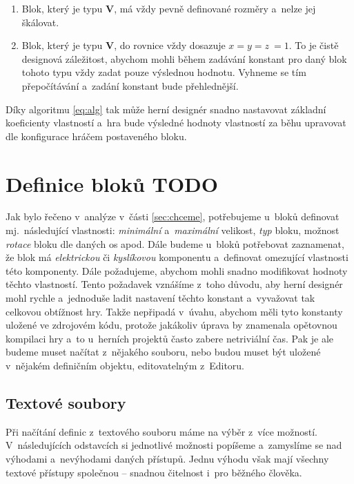 \begin{enumerate}
	\item Blok, který je typu \textbf{V}, má vždy pevně definované rozměry a~nelze jej škálovat.
	\item Blok, který je typu \textbf{V}, do rovnice vždy dosazuje $ x = y = z~= 1$.
	\subitem To je čistě designová záležitost, abychom mohli během zadávání konstant pro daný blok tohoto typu vždy zadat pouze výslednou hodnotu. Vyhneme se tím přepočítávání a~zadání konstant bude přehlednější.
\end{enumerate}

Díky algoritmu \ref{eq:alg} tak může herní designér snadno nastavovat základní koeficienty vlastností a~hra bude výsledné hodnoty vlastností za běhu upravovat dle konfigurace hráčem postaveného bloku.




\section{Definice bloků TODO}

Jak bylo řečeno v~analýze v~části \ref{sec:chceme}, potřebujeme u~bloků definovat mj.~následující vlastnosti: \textit{minimální} a~\textit{maximální} velikost, \textit{typ} bloku, možnost \textit{rotace} bloku dle daných os apod. Dále budeme u~bloků potřebovat zaznamenat, že blok má \textit{elektrickou} či \textit{kyslíkovou} komponentu a~definovat omezující vlastnosti této komponenty. Dále požadujeme, abychom mohli snadno modifikovat hodnoty těchto vlastností. Tento požadavek vznášíme z~toho důvodu, aby herní designér mohl rychle a~jednoduše ladit nastavení těchto konstant a~vyvažovat tak celkovou obtížnost hry. Takže nepřipadá v~úvahu, abychom měli tyto konstanty uložené ve zdrojovém kódu, protože jakákoliv úprava by znamenala opětovnou kompilaci hry a~to u~herních projektů často zabere netriviální čas. Pak je ale budeme muset načítat z~nějakého souboru, nebo budou muset být uložené v~nějakém definičním objektu, editovatelným z~Editoru.


\subsection{Textové soubory}
Při načítání definic z~textového souboru máme na výběr z~více možností. V~následujících odstavcích si jednotlivé možnosti popíšeme a~zamyslíme se nad výhodami a~nevýhodami daných přístupů. Jednu výhodu však mají všechny textové přístupy společnou -- snadnou čitelnost i~pro běžného člověka.

